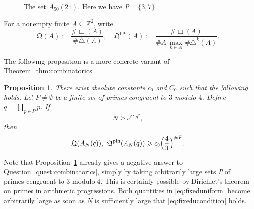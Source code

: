 \documentclass[10pt,a4paper]{amsart}
\newtheorem{proposition}[theorem]{Proposition}
\numberwithin{equation}{section}
\renewcommand{\geq}{\geqslant}
\begin{document}
\begin{figure}
\begin{center}
\hspace*{7mm}
\end{center}
\caption{The set $A_{50}(21)$. Here we have $P=\{3,7\}$.}
\label{fig:rec_tri_set_A}
\end{figure}

For a nonempty finite $A\subseteq\mathbb{Z}^2$, write
\[ \mathfrak{Q}(A):=\frac{\#\Box(A)}{\#\triangle(A)},
\quad \mathfrak{Q}^{\mathrm{pin}}(A):=
\frac{\#\Box(A)}{\#A\,\max_{k\in A}\limits \#\triangle^k(A)}. \]

The following proposition is a more concrete variant of Theorem~\ref{thm:combinatorics}.

\begin{proposition}\label{prop:fixedmodulus}
There exist absolute constants $c_0$ and $C_0$ such that the following holds. Let $P\neq\emptyset$ be a finite set of primes congruent to $3$ modulo $4$. Define $q=\prod_{p\in P}p$. If
\begin{equation}\label{eq:fixeducondition}
N\geq e^{C_0 q^2},
\end{equation}
then
\begin{equation}\label{eq:fixeduniform}
\mathfrak{Q}(A_N(q)),\ \mathfrak{Q}^{\mathrm{pin}}(A_N(q))
\geq c_0 \Bigl(\frac{4}{3}\Bigr)^{\#P}.
\end{equation}
\end{proposition}

Note that Proposition~\ref{prop:fixedmodulus} already gives a negative answer to Question~\ref{quest:combinatorics}, simply by taking arbitrarily large sets $P$ of primes congruent to $3$ modulo $4$. This is certainly possible by Dirichlet's theorem on primes in arithmetic progressions. Both quantities in \eqref{eq:fixeduniform} become arbitrarily large as soon as $N$ is sufficiently large that \eqref{eq:fixeducondition} holds.
\end{document}
